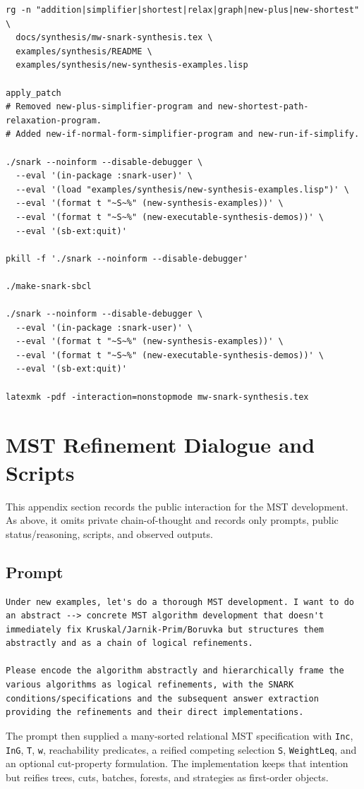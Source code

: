 \documentclass[runningheads]{llncs}
\begin{document}
\begin{lstlisting}
rg -n "addition|simplifier|shortest|relax|graph|new-plus|new-shortest" \
  docs/synthesis/mw-snark-synthesis.tex \
  examples/synthesis/README \
  examples/synthesis/new-synthesis-examples.lisp

apply_patch
# Removed new-plus-simplifier-program and new-shortest-path-relaxation-program.
# Added new-if-normal-form-simplifier-program and new-run-if-simplify.

./snark --noinform --disable-debugger \
  --eval '(in-package :snark-user)' \
  --eval '(load "examples/synthesis/new-synthesis-examples.lisp")' \
  --eval '(format t "~S~%" (new-synthesis-examples))' \
  --eval '(format t "~S~%" (new-executable-synthesis-demos))' \
  --eval '(sb-ext:quit)'

pkill -f './snark --noinform --disable-debugger'

./make-snark-sbcl

./snark --noinform --disable-debugger \
  --eval '(in-package :snark-user)' \
  --eval '(format t "~S~%" (new-synthesis-examples))' \
  --eval '(format t "~S~%" (new-executable-synthesis-demos))' \
  --eval '(sb-ext:quit)'

latexmk -pdf -interaction=nonstopmode mw-snark-synthesis.tex
\end{lstlisting}

\section{MST Refinement Dialogue and Scripts}

This appendix section records the public interaction for the MST development.
As above, it omits private chain-of-thought and records only prompts, public
status/reasoning, scripts, and observed outputs.

\subsection{Prompt}

\begin{lstlisting}
Under new examples, let's do a thorough MST development. I want to do an abstract --> concrete MST algorithm development that doesn't immediately fix Kruskal/Jarnik-Prim/Boruvka but structures them abstractly and as a chain of logical refinements.

Please encode the algorithm abstractly and hierarchically frame the various algorithms as logical refinements, with the SNARK conditions/specifications and the subsequent answer extraction providing the refinements and their direct implementations.
\end{lstlisting}
The prompt then supplied a many-sorted relational MST specification with
\texttt{Inc}, \texttt{InG}, \texttt{T}, \texttt{w}, reachability predicates,
a reified competing selection \texttt{S}, \texttt{WeightLeq}, and an optional
cut-property formulation.  The implementation keeps that intention but reifies
trees, cuts, batches, forests, and strategies as first-order objects.
\end{document}

